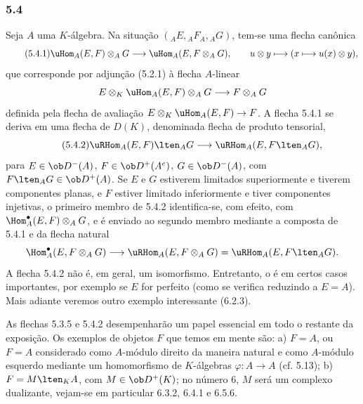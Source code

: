 \subsubsection*{5.4}

Seja $A$ uma $K$-álgebra. Na situação $({}_AE,{}_AF_A,{}_AG)$, tem-se uma flecha canônica
\begin{equation}\tag{5.4.1}
\uHom_A(E,F)\otimes_AG\longrightarrow\uHom_A(E,F\otimes_AG),
\qquad u\otimes y\longmapsto(x\longmapsto u(x)\otimes y),
\end{equation}
que corresponde por adjunção (5.2.1) à flecha $A$-linear
\[
E\otimes_K\uHom_A(E,F)\otimes_AG\longrightarrow F\otimes_AG
\]
definida pela flecha de avaliação $E\otimes_K\uHom_A(E,F)\to F$. A flecha 5.4.1 se deriva em uma flecha de $D(K)$, denominada flecha de produto tensorial,
\begin{equation}\tag{5.4.2}
\uRHom_A(E,F)\lten_AG\longrightarrow\uRHom_A(E,F\lten_AG),
\end{equation}
para $E\in\ob D^-(A)$, $F\in\ob D^+(A^e)$, $G\in\ob D^-(A)$, com $F\lten_AG\in\ob D^+(A)$. Se $E$ e $G$ estiverem limitados superiormente e tiverem componentes planas, e $F$ estiver limitado inferiormente e tiver componentes injetivas, o primeiro membro de 5.4.2 identifica-se, com efeito, com $\Hom_A^\bullet(E,F)\otimes_AG$, e é enviado ao segundo membro mediante a composta de 5.4.1 e da flecha natural
\[
\Hom_A^\bullet(E,F\otimes_AG)\longrightarrow \uRHom_A(E,F\otimes_AG)=\uRHom_A(E,F\lten_AG).
\]
A flecha 5.4.2 não é, em geral, um isomorfismo. Entretanto, o é em certos casos importantes, por exemplo se $E$ for perfeito (como se verifica reduzindo a $E=A$). Mais adiante veremos outro exemplo interessante (6.2.3).

As flechas 5.3.5 e 5.4.2 desempenharão um papel essencial em todo o restante da exposição. Os exemplos de objetos $F$ que temos em mente são: a) $F=A$, ou $F=A$ considerado como $A$-módulo direito da maneira natural e como $A$-módulo esquerdo mediante um homomorfismo de $K$-álgebras $\varphi:A\to A$ (cf. 5.13); b) $F=M\lten_KA$, com $M\in\ob D^+(K)$; no número 6, $M$ será um complexo dualizante, vejam-se em particular 6.3.2, 6.4.1 e 6.5.6.
